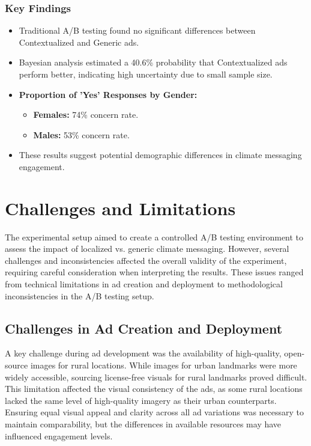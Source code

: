 \documentclass[a4paper,11pt]{article}
\begin{document}
\subsubsection{Key Findings}
\begin{itemize}
    \item Traditional A/B testing found no significant differences between Contextualized and Generic ads.
    \item Bayesian analysis estimated a 40.6\% probability that Contextualized ads perform better, indicating high uncertainty due to small sample size.
    \item \textbf{Proportion of 'Yes' Responses by Gender:}
    \begin{itemize}
        \item \textbf{Females:} 74\% concern rate.
        \item \textbf{Males:} 53\% concern rate.
    \end{itemize}
    \item These results suggest potential demographic differences in climate messaging engagement.
\end{itemize}


\section{Challenges and Limitations}
The experimental setup aimed to create a controlled A/B testing environment to assess the impact of localized vs. generic climate messaging. However, several challenges and inconsistencies affected the overall validity of the experiment, requiring careful consideration when interpreting the results. These issues ranged from technical limitations in ad creation and deployment to methodological inconsistencies in the A/B testing setup.

\subsection{Challenges in Ad Creation and Deployment}
A key challenge during ad development was the availability of high-quality, open-source images for rural locations. While images for urban landmarks were more widely accessible, sourcing license-free visuals for rural landmarks proved difficult. This limitation affected the visual consistency of the ads, as some rural locations lacked the same level of high-quality imagery as their urban counterparts. Ensuring equal visual appeal and clarity across all ad variations was necessary to maintain comparability, but the differences in available resources may have influenced engagement levels.
\end{document}

